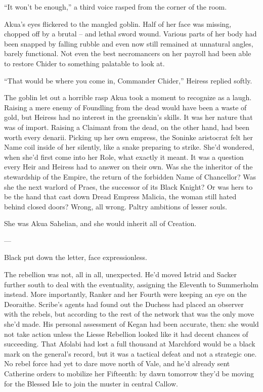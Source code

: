 \documentclass[12pt, openany]{book}
\begin{document}
“It won’t be enough,” a third voice rasped from the corner of the room.

Akua’s eyes flickered to the mangled goblin. Half of her face was missing, chopped off by a brutal – and lethal sword wound. Various parts of her body had been snapped by falling rubble and even now still remained at unnatural angles, barely functional. Not even the best necromancers on her payroll had been able to restore Chider to something palatable to look at.

“That would be where you come in, Commander Chider,” Heiress replied softly.

The goblin let out a horrible rasp Akua took a moment to recognize as a laugh. Raising a mere enemy of Foundling from the dead would have been a waste of gold, but Heiress had no interest in the greenskin’s skills. It was her nature that was of import. Raising a Claimant from the dead, on the other hand, had been worth every denarii. Picking up her own empress, the Soninke aristocrat felt her Name coil inside of her silently, like a snake preparing to strike. She’d wondered, when she’d first come into her Role, what exactly it meant. It was a question every Heir and Heiress had to answer on their own. Was she the inheritor of the stewardship of the Empire, the return of the forbidden Name of Chancellor? Was she the next warlord of Praes, the successor of its Black Knight? Or was hers to be the hand that cast down Dread Empress Malicia, the woman still hated behind closed doors? Wrong, all wrong. Paltry ambitions of lesser souls.

She was Akua Sahelian, and she would inherit all of Creation.

—



Black put down the letter, face expressionless.

The rebellion was not, all in all, unexpected. He’d moved Istrid and Sacker further south to deal with the eventuality, assigning the Eleventh to Summerholm instead. More importantly, Ranker and her Fourth were keeping an eye on the Deoraithe. Scribe’s agents had found out the Duchess had placed an observer with the rebels, but according to the rest of the network that was the only move she’d made. His personal assessment of Kegan had been accurate, then: she would not take action unless the Liesse Rebellion looked like it had decent chances of succeeding. That Afolabi had lost a full thousand at Marchford would be a black mark on the general’s record, but it was a tactical defeat and not a strategic one. No rebel force had yet to dare move north of Vale, and he’d already sent Catherine orders to mobilize her Fifteenth: by dawn tomorrow they’d be moving for the Blessed Isle to join the muster in central Callow.
\end{document}
